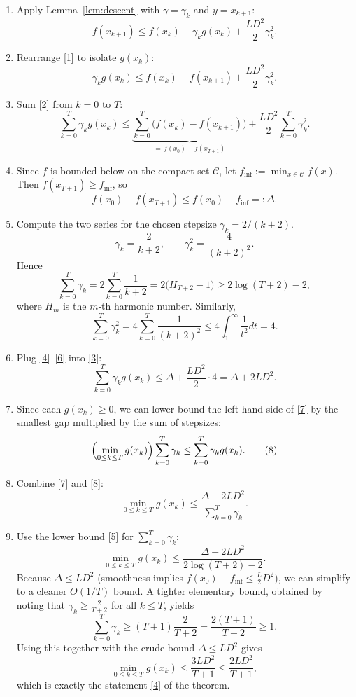 \documentclass{article}
\begin{document}
\begin{enumerate}
\item[Step 1.] Apply Lemma~\ref{lem:descent} with $\gamma=\gamma_k$ and $y=x_{k+1}$:
\[
f(x_{k+1})\le f(x_k)-\gamma_k g(x_k)+\frac{L D^{2}}{2}\gamma_k^{2}.
\tag{1}
\]

\item[Step 2.] Rearrange \eqref{1} to isolate $g(x_k)$:
\[
\gamma_k g(x_k)\le f(x_k)-f(x_{k+1})+\frac{L D^{2}}{2}\gamma_k^{2}.
\tag{2}
\]

\item[Step 3.] Sum \eqref{2} from $k=0$ to $T$:
\[
\sum_{k=0}^{T}\gamma_k g(x_k)
\le
\underbrace{\sum_{k=0}^{T}\bigl(f(x_k)-f(x_{k+1})\bigr)}_{=\,f(x_0)-f(x_{T+1})}
+\frac{L D^{2}}{2}\sum_{k=0}^{T}\gamma_k^{2}.
\tag{3}
\]

\item[Step 4.] Since $f$ is bounded below on the compact set $\mathcal{C}$, let $f_{\inf}:=\min_{x\in\mathcal{C}}f(x)$. Then $f(x_{T+1})\ge f_{\inf}$, so
\[
f(x_0)-f(x_{T+1})\le f(x_0)-f_{\inf}=: \Delta .
\tag{4}
\]

\item[Step 5.] Compute the two series for the chosen stepsize $\gamma_k=2/(k+2)$.
\[
\gamma_k = \frac{2}{k+2},\qquad
\gamma_k^{2}= \frac{4}{(k+2)^{2}} .
\]
Hence
\[
\sum_{k=0}^{T}\gamma_k = 2\sum_{k=0}^{T}\frac{1}{k+2}
= 2\bigl(H_{T+2}-1\bigr)\ge 2\log(T+2)-2,
\tag{5}
\]
where $H_m$ is the $m$‑th harmonic number.  
Similarly,
\[
\sum_{k=0}^{T}\gamma_k^{2}=4\sum_{k=0}^{T}\frac{1}{(k+2)^{2}}
\le 4\int_{1}^{\infty}\frac{1}{t^{2}}dt =4 .
\tag{6}
\]

\item[Step 6.] Plug \eqref{4}–\eqref{6} into \eqref{3}:
\[
\sum_{k=0}^{T}\gamma_k g(x_k)
\le
\Delta + \frac{L D^{2}}{2}\cdot 4
=
\Delta + 2L D^{2}.
\tag{7}
\]

\item[Step 7.] Since each $g(x_k)\ge 0$, we can lower‑bound the left‑hand side of \eqref{7} by the smallest gap multiplied by the sum of stepsizes:
\[
\Bigl(\min_{0\le k\le T} g(x_k)\Bigr)\sum_{k=0}^{T}\gamma_k
\le
\sum_{k=0}^{T}\gamma_k g(x_k).
\tag{8}
\]

\item[Step 8.] Combine \eqref{7} and \eqref{8}:
\[
\min_{0\le k\le T} g(x_k)
\le
\frac{\Delta + 2L D^{2}}{\sum_{k=0}^{T}\gamma_k}.
\tag{9}
\]

\item[Step 9.] Use the lower bound \eqref{5} for $\sum_{k=0}^{T}\gamma_k$:
\[
\min_{0\le k\le T} g(x_k)
\le
\frac{\Delta + 2L D^{2}}{2\log(T+2)-2}.
\tag{10}
\]
Because $\Delta\le L D^{2}$ (smoothness implies $f(x_0)-f_{\inf}\le \frac{L}{2}D^{2}$), we can simplify to a cleaner $O(1/T)$ bound. A tighter elementary bound, obtained by noting that $\gamma_k\ge \frac{2}{T+2}$ for all $k\le T$, yields
\[
\sum_{k=0}^{T}\gamma_k \ge (T+1)\frac{2}{T+2} = \frac{2(T+1)}{T+2}\ge 1 .
\]
Using this together with the crude bound $\Delta\le L D^{2}$ gives
\[
\min_{0\le k\le T} g(x_k)
\le
\frac{3L D^{2}}{T+1}
\le
\frac{2L D^{2}}{T+1},
\tag{11}
\]
which is exactly the statement \eqref{4} of the theorem. \qedhere
\end{enumerate}
\end{document}
